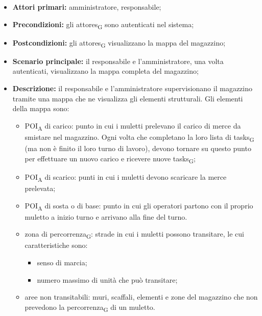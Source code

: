 \begin{itemize}
	\item 	\textbf{Attori primari:} amministratore, responsabile;
	\item 	\textbf{Precondizioni:} gli \glspl{attore}\textsubscript{G} sono autenticati nel sistema;
	\item 	\textbf{Postcondizioni:} gli \glspl{attore}\textsubscript{G} visualizzano la mappa del magazzino;
	\item 	\textbf{Scenario principale:} il responsabile e l'amministratore, una volta autenticati, visualizzano la mappa completa del magazzino;
	\item 	\textbf{Descrizione:} il responsabile e l'amministratore supervisionano il magazzino tramite una mappa che ne visualizza gli elementi strutturali. Gli elementi della mappa sono:
	\begin{itemize}
		\item \acrshort{POI}\textsubscript{A} di carico:  punto in cui i muletti prelevano il carico di merce da smistare nel magazzino. Ogni volta che completano la loro lista di \glspl{task}\textsubscript{G} (ma non è finito il loro turno di lavoro), devono tornare su questo punto per effettuare un nuovo carico e ricevere nuove \glspl{task}\textsubscript{G};
		\item \acrshort{POI}\textsubscript{A} di scarico: punti in cui i muletti devono scaricare la merce prelevata;
		\item \acrshort{POI}\textsubscript{A} di sosta o di base: punto in cui gli operatori partono con il proprio muletto a inizio turno e arrivano alla fine del turno.
		\item zona di \gls{percorrenza}\textsubscript{G}: strade in cui i muletti possono transitare, le cui caratteristiche sono:
		\begin{itemize}
			\item senso di marcia;
			\item numero massimo di unità che può transitare;
		\end{itemize}
		\item aree non transitabili: muri, scaffali, elementi e zone del magazzino che non prevedono la \gls{percorrenza}\textsubscript{G} di un muletto.
	\end{itemize}

\end{itemize}



